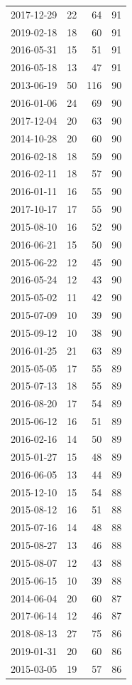 \begin{tabular}{lrrr}
2017-12-29 & 22 & 64 & 91 \\
2019-02-18 & 18 & 60 & 91 \\
2016-05-31 & 15 & 51 & 91 \\
2016-05-18 & 13 & 47 & 91 \\
2013-06-19 & 50 & 116 & 90 \\
2016-01-06 & 24 & 69 & 90 \\
2017-12-04 & 20 & 63 & 90 \\
2014-10-28 & 20 & 60 & 90 \\
2016-02-18 & 18 & 59 & 90 \\
2016-02-11 & 18 & 57 & 90 \\
2016-01-11 & 16 & 55 & 90 \\
2017-10-17 & 17 & 55 & 90 \\
2015-08-10 & 16 & 52 & 90 \\
2016-06-21 & 15 & 50 & 90 \\
2015-06-22 & 12 & 45 & 90 \\
2016-05-24 & 12 & 43 & 90 \\
2015-05-02 & 11 & 42 & 90 \\
2015-07-09 & 10 & 39 & 90 \\
2015-09-12 & 10 & 38 & 90 \\
2016-01-25 & 21 & 63 & 89 \\
2015-05-05 & 17 & 55 & 89 \\
2015-07-13 & 18 & 55 & 89 \\
2016-08-20 & 17 & 54 & 89 \\
2015-06-12 & 16 & 51 & 89 \\
2016-02-16 & 14 & 50 & 89 \\
2015-01-27 & 15 & 48 & 89 \\
2016-06-05 & 13 & 44 & 89 \\
2015-12-10 & 15 & 54 & 88 \\
2015-08-12 & 16 & 51 & 88 \\
2015-07-16 & 14 & 48 & 88 \\
2015-08-27 & 13 & 46 & 88 \\
2015-08-07 & 12 & 43 & 88 \\
2015-06-15 & 10 & 39 & 88 \\
2014-06-04 & 20 & 60 & 87 \\
2017-06-14 & 12 & 46 & 87 \\
2018-08-13 & 27 & 75 & 86 \\
2019-01-31 & 20 & 60 & 86 \\
2015-03-05 & 19 & 57 & 86 \\

\end{tabular}
